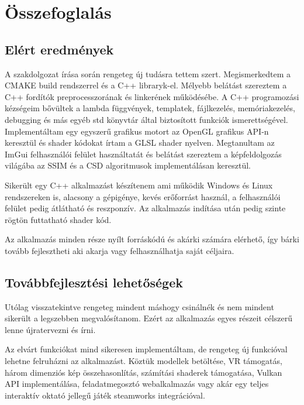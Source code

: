 \chapter*{Összefoglalás}

\section{Elért eredmények}
A szakdolgozat írása során rengeteg új tudásra tettem szert. Megismerkedtem a CMAKE build rendszerrel és a C++ libraryk-el. Mélyebb belátást szereztem a C++ fordítók preprocesszorának és linkerének működésébe. A C++ programozási kézségeim bővültek a lambda függvények, templatek, fájlkezelés, memóriakezelés, debugging és más egyéb std könyvtár által biztosított funkciók ismerettségével. Implementáltam egy egyszerű grafikus motort az OpenGL grafikus API-n keresztül és shader kódokat írtam a GLSL shader nyelven. Megtanultam az ImGui felhasználói felület használtatát és belátást szereztem a képfeldolgozás világába az SSIM és a CSD algoritmusok implementálásan keresztül.

Sikerült egy C++ alkalmazást készítenem ami működik Windows és Linux rendszereken is, alacsony a gépigénye, kevés erőforrást használ, a felhasználói felület pedig átlátható és reszponzív. Az alkalmazás indítása után pedig szinte rögtön futtatható shader kód.

Az alkalmazás minden része nyílt forráskódú és akárki számára elérhető, így bárki tovább fejlesztheti aki akarja vagy felhasználhatja saját céljaira.


\section{Továbbfejlesztési lehetőségek}
Utólag visszatekintve rengeteg mindent máshogy csinálnék és nem mindent sikerült a legszebben megvalósítanom. Ezért az alkalmazás egyes részeit célszerű lenne újratervezni és írni.

Az elvárt funkciókat mind sikeresen implementáltam, de rengeteg új funkcióval lehetne felruházni az alkalmazást. Köztük modellek betöltése, VR támogatás, három dimenziós kép összehasonlítás, számítási shaderek támogatása, Vulkan API implementálása, feladatmegosztó webalkalmazás vagy akár egy teljes interaktív oktató jellegű játék steamworks integrációval.
